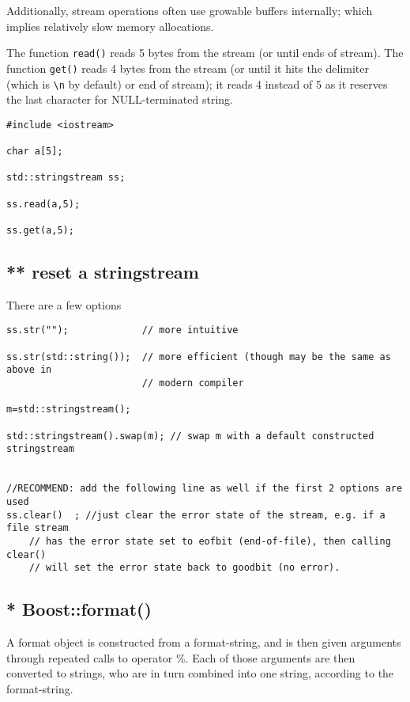 Additionally, stream operations often use growable buffers internally; which
implies relatively slow memory allocations.





The function \verb!read()! reads 5 bytes from the stream (or until ends of
stream). The function \verb!get()! reads 4 bytes from the stream (or until it
hits the delimiter (which is \verb!\n! by default) or end of stream); it reads 4
instead of 5 as it reserves the last character for NULL-terminated string.
\begin{verbatim}
#include <iostream>

char a[5];

std::stringstream ss;

ss.read(a,5);

ss.get(a,5);
\end{verbatim}

\subsection{** reset a stringstream}
\label{sec:stringstream-reset}

There are a few options

\begin{verbatim}
ss.str("");             // more intuitive

ss.str(std::string());  // more efficient (though may be the same as above in
                        // modern compiler
       
m=std::stringstream();

std::stringstream().swap(m); // swap m with a default constructed stringstream


//RECOMMEND: add the following line as well if the first 2 options are used
ss.clear()  ; //just clear the error state of the stream, e.g. if a file stream
    // has the error state set to eofbit (end-of-file), then calling clear()
    // will set the error state back to goodbit (no error).

\end{verbatim}


\subsection{* Boost::format()}
\label{sec:Boost::format()}

A  format object is constructed from a format-string, and is then given
arguments through repeated calls to operator \%. Each of those arguments are
then converted to strings, who are in turn combined into one string, according
to the format-string.

